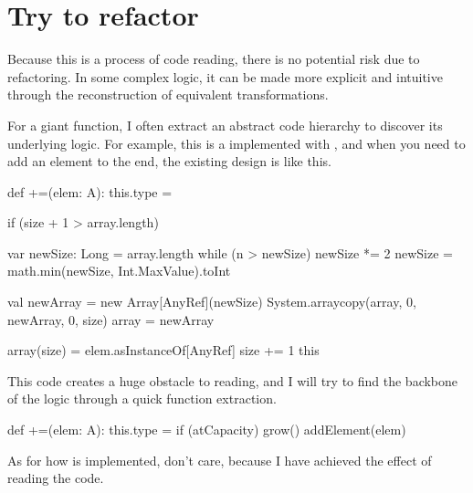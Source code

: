 \section{Try to refactor}
\begin{content}
Because this is a process of code reading, there is no potential risk due to refactoring. In some complex logic, it can be made more explicit and intuitive through the reconstruction of equivalent transformations.

For a giant function, I often extract an abstract code hierarchy to discover its underlying logic. For example, this is a  implemented with , and when you need to add an element to the end, the existing design is like this.

\begin{leftbar}
\begin{python}
def +=(elem: A): this.type = {
  if (size + 1 > array.length) {
    var newSize: Long = array.length
    while (n > newSize)
      newSize *= 2
    newSize = math.min(newSize, Int.MaxValue).toInt
  
    val newArray = new Array[AnyRef](newSize)
    System.arraycopy(array, 0, newArray, 0, size)
    array = newArray
  }
  array(size) = elem.asInstanceOf[AnyRef]
  size += 1
  this
}
\end{python}
\end{leftbar}

This code creates a huge obstacle to reading, and I will try to find the backbone of the logic through a quick function extraction.

\begin{leftbar}
\begin{python}
def +=(elem: A): this.type = {
  if (atCapacity)
    grow()
  addElement(elem)
}
\end{python}
\end{leftbar}

As for how  is implemented, don't care, because I have achieved the effect of reading the code.
\end{content}


